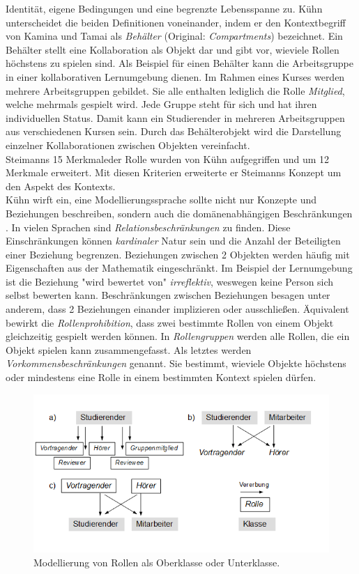 \documentclass[conference]{IEEEtran}
\begin{document}
Identität, eigene Bedingungen und eine begrenzte Lebensspanne zu\cite{kamai2005selective}. Kühn unterscheidet die beiden Definitionen voneinander, indem er den Kontextbegriff von Kamina und Tamai als \textit{Behälter} (Original: \textit{Compartments}) bezeichnet. Ein Behälter stellt eine Kollaboration als Objekt dar und gibt vor, wieviele Rollen höchstens zu spielen sind. Als Beispiel für einen Behälter kann die Arbeitsgruppe in einer kollaborativen Lernumgebung dienen. Im Rahmen eines Kurses werden mehrere Arbeitsgruppen gebildet. Sie alle enthalten lediglich die Rolle \textit{Mitglied}, welche mehrmals gespielt wird. Jede Gruppe steht für sich und hat ihren individuellen Status. Damit kann ein Studierender in mehreren Arbeitsgruppen aus verschiedenen Kursen sein. Durch das Behälterobjekt wird die Darstellung einzelner Kollaborationen zwischen Objekten vereinfacht. \\ Steimanns 15 Merkmale\cite{steimann2000representation}der Rolle wurden von Kühn aufgegriffen und um 12 Merkmale erweitert. Mit diesen Kriterien erweiterte er Steimanns Konzept um den Aspekt des Kontexts.
\\ Kühn wirft ein, eine Modellierungssprache sollte nicht nur Konzepte und Beziehungen beschreiben, sondern auch die domänenabhängigen Beschränkungen \cite{family}. In vielen Sprachen sind \textit{Relationsbeschränkungen} zu finden. Diese Einschränkungen können \textit{kardinaler} Natur sein und die Anzahl der Beteiligten einer Beziehung begrenzen. Beziehungen zwischen 2 Objekten werden häufig mit Eigenschaften aus der Mathematik eingeschränkt. Im Beispiel der Lernumgebung ist die Beziehung "wird bewertet von" \textit{irreflektiv}, weswegen keine Person sich selbst bewerten kann. Beschränkungen zwischen Beziehungen besagen unter anderem, dass 2 Beziehungen einander implizieren oder ausschließen. Äquivalent bewirkt die \textit{Rollenprohibition}, dass zwei bestimmte Rollen von einem Objekt gleichzeitig gespielt werden können. In \textit{Rollengruppen} werden alle Rollen, die ein Objekt spielen kann zusammengefasst. Als letztes werden \textit{Vorkommensbeschränkungen} genannt. Sie bestimmt, wieviele Objekte höchstens oder mindestens eine Rolle in einem bestimmten Kontext spielen dürfen.\\ 



\begin{figure}
\includegraphics[scale=0.6]{Images/OomRoleProblems.PNG}
\caption{Modellierung von Rollen als Oberklasse oder Unterklasse.}
\end{figure}
\end{document}
